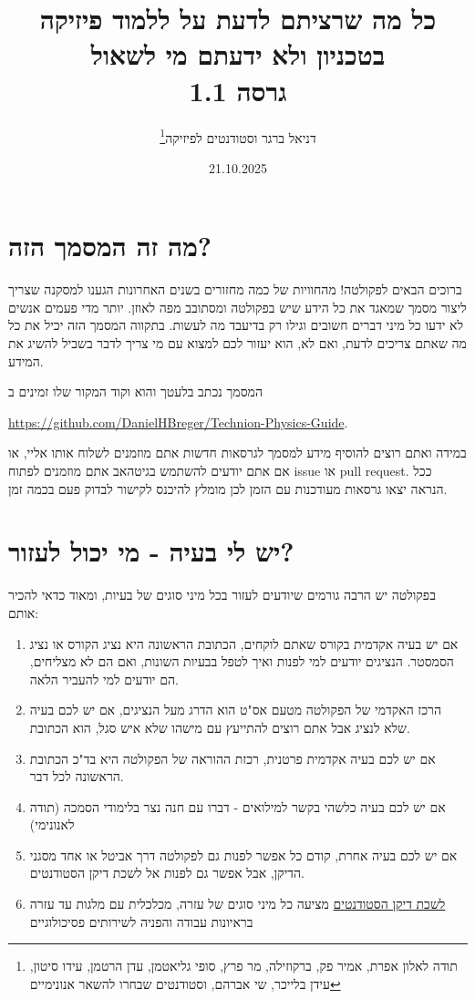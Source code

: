 \documentclass[a4paper,12pt]{article}
\title{כל מה שרציתם לדעת על ללמוד פיזיקה בטכניון ולא ידעתם מי לשאול\\
        \large גרסה 1.1}
\author{דניאל ברגר וסטודנטים לפיזיקה\footnote{תודה לאלון אפרת, אמיר פק, ברקוזילה, מר פרץ, סופי גליאטמן, עדן הרטמן, עידו סיטון, עידן בלייכר, שי אברהם, וסטודנטים שבחרו להשאר אנונימיים}}
\date{21.10.2025}
\begin{document}
\maketitle
\tableofcontents

\newpage

\section{מה זה המסמך הזה?}

ברוכים הבאים לפקולטה! מהחוויות של כמה מחזורים בשנים האחרונות הגענו למסקנה שצריך ליצור מסמך שמאגד את כל הידע שיש בפקולטה ומסתובב מפה לאוזן. יותר מדי פעמים אנשים לא ידעו כל מיני דברים חשובים וגילו רק בדיעבד מה לעשות. בתקווה המסמך הזה יכיל את כל מה שאתם צריכים לדעת, ואם לא, הוא יעזור לכם למצוא עם מי צריך לדבר בשביל להשיג את המידע.

המסמך נכתב בלעטך והוא וקוד המקור שלו זמינים ב 

\textenglish{\url{https://github.com/DanielHBreger/Technion-Physics-Guide}}.

במידה ואתם רוצים להוסיף מידע למסמך לגרסאות חדשות אתם מוזמנים לשלוח אותו אליי, או אם אתם יודעים להשתמש בגיטהאב אתם מוזמנים לפתוח \textenglish{issue} או \textenglish{pull request}. ככל הנראה יצאו גרסאות מעודכנות עם הזמן לכן מומלץ להיכנס לקישור לבדוק פעם בכמה זמן.

\section{יש לי בעיה - מי יכול לעזור?}

בפקולטה יש הרבה גורמים שיודעים לעזור בכל מיני סוגים של בעיות, ומאוד כדאי להכיר אותם:

\begin{enumerate}
    \item אם יש בעיה אקדמית בקורס שאתם לוקחים, הכתובת הראשונה היא נציג הקורס או נציג הסמסטר. הנציגים יודעים למי לפנות ואיך לטפל בבעיות השונות, ואם הם לא מצליחים, הם יודעים למי להעביר הלאה.
    \item הרכז האקדמי של הפקולטה מטעם אס"ט הוא הדרג מעל הנציגים, אם יש לכם בעיה שלא לנציג אבל אתם רוצים להתייעץ עם מישהו שלא איש סגל, הוא הכתובת.
    \item אם יש לכם בעיה אקדמית פרטנית, רכזת ההוראה של הפקולטה היא בד"כ הכתובת הראשונה לכל דבר. 
    \item אם יש לכם בעיה כלשהי בקשר למילואים - דברו עם חנה נצר בלימודי הסמכה (תודה לאנונימי)
    \item אם יש לכם בעיה אחרת, קודם כל אפשר לפנות גם לפקולטה דרך אביטל או אחד מסגני הדיקן, אבל אפשר גם לפנות אל לשכת דיקן הסטודנטים.
    \item \href{https://dean.technion.ac.il/}{לשכת דיקן הסטודנטים} מציעה כל מיני סוגים של עזרה, מכלכלית עם מלגות עד עזרה בראיונות עבודה והפניה לשירותים פסיכולוגיים
\end{enumerate}
\end{document}
